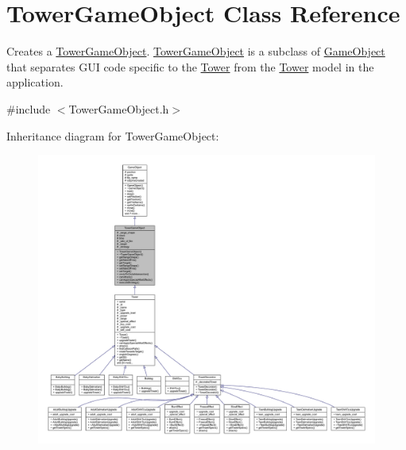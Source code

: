 \hypertarget{class_tower_game_object}{\section{Tower\+Game\+Object Class Reference}
\label{class_tower_game_object}
}


Creates a \hyperlink{class_tower_game_object}{Tower\+Game\+Object}. \hyperlink{class_tower_game_object}{Tower\+Game\+Object} is a subclass of \hyperlink{class_game_object}{Game\+Object} that separates G\+U\+I code specific to the \hyperlink{class_tower}{Tower} from the \hyperlink{class_tower}{Tower} model in the application.  




{\ttfamily \#include $<$Tower\+Game\+Object.\+h$>$}



Inheritance diagram for Tower\+Game\+Object\+:
\nopagebreak
\begin{figure}[H]
\begin{center}
\leavevmode
\includegraphics[width=350pt]{class_tower_game_object__inherit__graph}
\end{center}
\end{figure}


